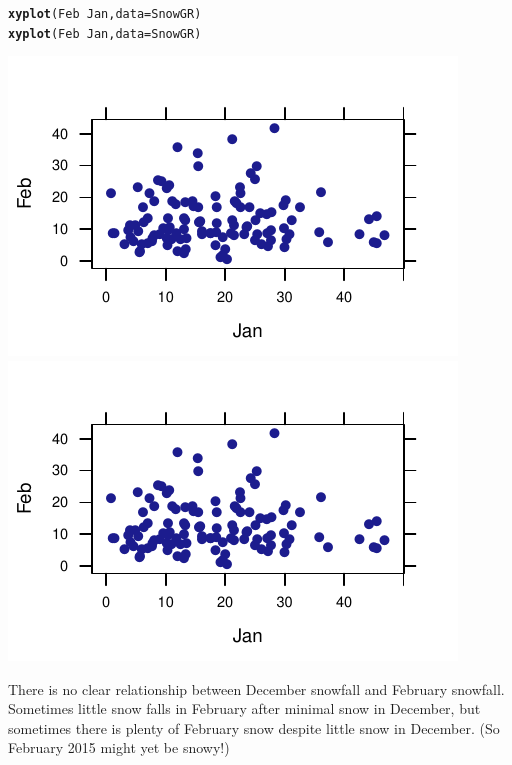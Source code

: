 \documentclass[twoside]{book}\usepackage[]{graphicx}\usepackage[]{xcolor}
\makeatletter
\def\maxwidth{ %
  \ifdim\Gin@nat@width>\linewidth
    \linewidth
  \else
    \Gin@nat@width
  \fi
}
\newcommand{\hlopt}[1]{\textcolor[rgb]{0,0,0}{#1}}%
\newcommand{\hlstd}[1]{\textcolor[rgb]{0.345,0.345,0.345}{#1}}%
\newcommand{\hlkwc}[1]{\textcolor[rgb]{0.333,0.667,0.333}{#1}}%
\newcommand{\hlkwd}[1]{\textcolor[rgb]{0.737,0.353,0.396}{\textbf{#1}}}%
\newenvironment{kframe}{%
 \def\at@end@of@kframe{}%
 \ifinner\ifhmode%
  \def\at@end@of@kframe{\end{minipage}}%
  \begin{minipage}{\columnwidth}%
 \fi\fi%
 \def\FrameCommand##1{\hskip\@totalleftmargin \hskip-\fboxsep
 \colorbox{shadecolor}{##1}\hskip-\fboxsep
     \hskip-\linewidth \hskip-\@totalleftmargin \hskip\columnwidth}%
 \MakeFramed {\advance\hsize-\width
   \@totalleftmargin\z@ \linewidth\hsize
   \@setminipage}}%
 {\par\unskip\endMakeFramed%
 \at@end@of@kframe}
\newenvironment{knitrout}{}{} %
\makeatother
\begin{document}
\begin{solution}
\begin{knitrout}
\color{fgcolor}\begin{kframe}
\begin{alltt}
\hlkwd{xyplot}\hlstd{(Feb} \hlopt{~} \hlstd{Jan,} \hlkwc{data} \hlstd{= SnowGR)}
\hlkwd{xyplot}\hlstd{(Feb} \hlopt{~} \hlstd{Jan,} \hlkwc{data} \hlstd{= SnowGR)}
\end{alltt}
\end{kframe}

{\centering \includegraphics[width=\maxwidth]{figures/fig-unnamed-chunk-39-1} 
\includegraphics[width=\maxwidth]{figures/fig-unnamed-chunk-39-2} 

}



\end{knitrout}
There is no clear relationship between December snowfall and February snowfall.  
Sometimes little snow falls in February after minimal snow in December, but sometimes
there is plenty of February snow despite little snow in December.  (So February 2015 might
yet be snowy!)
\end{solution}
\shipoutProblems
\end{document}
